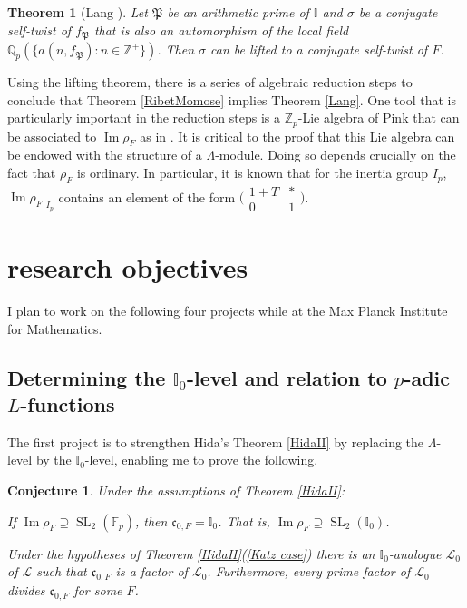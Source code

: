 \documentclass[11pt]{amsart}
\newtheorem{thm}{Theorem}[section]
\newtheorem{conj}{Conjecture}
\theoremstyle{definition}
\theoremstyle{remark}
\def\cc{\mathfrak{c}}
\def\F{\mathbb{F}}
\def\I{\mathbb{I}}
\def\aL{\mathcal{L}}
\def\Pp{\mathfrak{P}}
\def\Q{\mathbb{Q}}
\def\Z{\mathbb{Z}}
\DeclareMathOperator{\im}{Im}
\DeclareMathOperator{\SL}{SL}
\begin{document}
\begin{thm}[Lang \cite{Lang15}]\label{lifting}
Let $\Pp$ be an arithmetic prime of $\I$ and $\sigma$ be a conjugate self-twist of $f_\Pp$ that is also an automorphism of the local field $\Q_p(\{a(n, f_\Pp) : n \in \Z^+\})$.  Then $\sigma$ can be lifted to a conjugate self-twist of $F$.
\end{thm}

Using the lifting theorem, there is a series of algebraic reduction steps to conclude that Theorem \ref{RibetMomose} implies Theorem \ref{Lang}.  One tool that is particularly important in the reduction steps is a $\Z_p$-Lie algebra of Pink \cite{Pink93} that can be associated to $\im \rho_F$ as in \cite{Hida15}.  It is critical to the proof that this Lie algebra can be endowed with the structure of a $\Lambda$-module.  Doing so depends crucially on the fact that $\rho_F$ is ordinary.  In particular, it is known \cite[Theorem 4.3.2]{HidaGME} that for the inertia group $I_p$, $\im \rho_F|_{I_p}$ contains an element of the form
$\bigl(
\begin{smallmatrix}
1 + T & *\\
0 & 1
\end{smallmatrix}
\bigr)$. 

\section*{research objectives}\label{future}
I plan to work on the following four projects while at the Max Planck Institute for Mathematics.
\subsection*{Determining the $\I_0$-level and relation to $p$-adic $L$-functions}
The first project is to strengthen Hida's Theorem \ref{HidaII} by replacing the $\Lambda$-level by the $\I_0$-level, enabling me to prove the following.

\begin{conj}\label{level}
Under the assumptions of Theorem \ref{HidaII}:
\begin{enumerate*}
\item\label{full} If $\im \rho_F \supseteq \SL_2(\F_p)$, then $\cc_{0,F} = \I_0$.  That is, $\im \rho_F \supseteq \SL_2(\I_0)$.
\item\label{Katz} Under the hypotheses of Theorem \ref{HidaII}(\ref{Katz case}) there is an $\I_0$-analogue $\aL_0$ of $\aL$ such that $\cc_{0,F}$ is a factor of $\aL_0$.  Furthermore, every prime factor of $\aL_0$ divides $\cc_{0, F}$ for some $F$. 
\end{enumerate*}
\end{conj}
\end{document}
